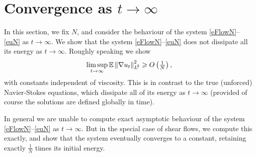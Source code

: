 \documentclass[final]{amsart}%
\newcommand{\mceuler}{\eqref{eFlowN}--\eqref{euN}\xspace}
\newcommand{\lap}{\triangle}
\newcommand{\grad}{\nabla}
\renewcommand{\geq}{\geqslant}
\newcommand{\E}{\mathbb{E}}
\DeclareMathOperator{\var}{Var}
\newif\iftextstyle
\newcommand{\norm}[1]{\iftextstyle\lVert#1\rVert\else\left\lVert#1\right\rVert\fi}
\newcommand{\lpnorm}[2]{\norm{#1}_{\smash{L^{\!#2}_{\vphantom{h}}}\vphantom{L^{\!#2}}}}
\numberwithin{equation}{section}
\newtheorem{theorem}{Theorem}[section]
\newtheorem{lemma}[theorem]{Lemma}
\theoremstyle{definition}
\theoremstyle{remark}
\begin{document}
\fi%
%

\section{Convergence as \texorpdfstring{$t \to \infty$}{t to infinity}}\label{sTtoInfty}%
In this section, we fix $N$, and consider the behaviour of the system
\mceuler as $t \to \infty$. We show that the system \mceuler does not
dissipate all its energy as $t \to \infty$. Roughly speaking we show
$$
\limsup_{t \to \infty} \E \lpnorm{\grad u_t}{2}^2 \geq
O\left(\tfrac{1}{N}\right),
$$
with constants independent of viscosity.
This is in contrast to the true (unforced) Navier-Stokes equations,
which dissipate all of its energy as $t \to \infty$ (provided of
course the solutions are defined globally in time).

In general we are unable to compute exact asymptotic behaviour of the
system \mceuler as $t \to \infty$. But in the special case of shear
flows, we compute this exactly, and show that the system eventually
converges to a constant, retaining exactly $\frac{1}{N}$ times its
initial energy.
\end{document}
